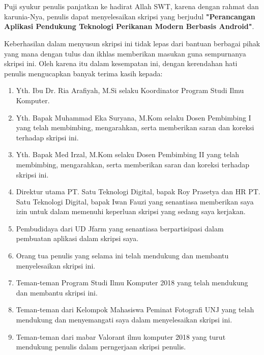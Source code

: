 \chapter*{}

Puji syukur penulis panjatkan ke hadirat Allah SWT, karena dengan rahmat dan karunia-Nya, penulis dapat menyelesaikan skripsi yang berjudul \textbf{"Perancangan Aplikasi Pendukung Teknologi Perikanan Modern Berbasis Android"}.

Keberhasilan dalam menyusun skripsi ini tidak lepas dari bantuan berbagai pihak yang mana dengan tulus dan ikhlas memberikan masukan guna sempurnanya skripsi ini. Oleh karena itu dalam kesempatan ini, dengan kerendahan hati penulis mengucapkan banyak terima kasih kepada:

\begin{enumerate}

	\item{Yth. Ibu Dr. Ria Arafiyah, M.Si selaku Koordinator Program Studi Ilmu Komputer.}
	\item{Yth. Bapak Muhammad Eka Suryana, M.Kom selaku Dosen Pembimbing I yang telah membimbing, mengarahkan, serta memberikan saran dan koreksi terhadap skripsi ini.}
	\item{Yth. Bapak Med Irzal, M.Kom selaku Dosen Pembimbing II yang telah membimbing, mengarahkan, serta memberikan saran dan koreksi terhadap skripsi ini.}
	\item{Direktur utama PT. Satu Teknologi Digital, bapak Roy Prasetya dan HR PT. Satu Teknologi Digital, bapak Iwan Fauzi yang senantiasa memberikan saya izin untuk dalam memenuhi keperluan skripsi yang sedang saya kerjakan.}
	\item{Pembudidaya dari UD Jfarm yang senantiasa berpartisipasi dalam pembuatan aplikasi dalam skripsi saya.}
	\item{Orang tua penulis yang selama ini telah mendukung dan membantu menyelesaikan skripsi ini.}
	\item{Teman-teman Program Studi Ilmu Komputer 2018 yang telah mendukung dan membantu skripsi ini.}
	\item{Teman-teman dari Kelompok Mahasiswa Peminat Fotografi UNJ yang telah mendukung dan menyemangati saya dalam menyelesaikan skripsi ini.}
	\item{Teman-teman dari mabar Valorant ilmu komputer 2018 yang turut mendukung penulis dalam perngerjaan skripsi penulis.}
	
\end{enumerate}

